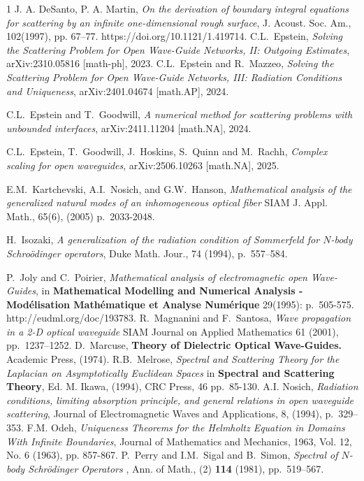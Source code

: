 \documentclass[11pt]{article}
\theoremstyle{definition}
\theoremstyle{remark}
\begin{document}
\begin{thebibliography}{1}
   {\sc J. A. DeSanto, P. A. Martin}, {\em On the
    derivation of boundary integral equations for scattering by an infinite
    one-dimensional rough surface}, J. Acoust. Soc. Am., 102(1997),
    pp. 67--77. https://doi.org/10.1121/1.419714.
    {\sc C.L.~Epstein}, {\em Solving the  Scattering
  Problem for Open Wave-Guide Networks, II: Outgoing Estimates},  	arXiv:2310.05816 [math-ph], 2023.
  {\sc C.L.~Epstein and R.~Mazzeo}, {\em Solving the Scattering Problem for
    Open Wave-Guide Networks, III: Radiation Conditions and Uniqueness},
  arXiv:2401.04674 [math.AP], 2024.

   {\sc C.L.~Epstein and T.~Goodwill}, {\em A numerical method
    for scattering problems with unbounded interfaces}, arXiv:2411.11204
    [math.NA], 2024.
 
    
      {\sc C.L.~Epstein, T.~Goodwill, J.~Hoskins, S.~Quinn and
    M.~Rachh}, {\em Complex scaling for open waveguides}, 
    arXiv:2506.10263 [math.NA], 2025.

 {\sc E.M.~Kartchevski, A.I.~Nosich, and G.W.~Hanson},   {\em Mathematical analysis
 of the generalized natural modes of an inhomogeneous optical fiber} SIAM
 J.  Appl. Math., 65(6), (2005) p.~2033-2048.

   
{\sc H.~Isozaki}, {\em A generalization of the radiation condition of Sommerfeld
  for $N$-body Schro\"odinger operators}, Duke
Math. Jour., 74 (1994), p.~557–584.

 {\sc P.~Joly and C.~Poirier}, {\em Mathematical
  analysis of electromagnetic open Wave-Guides}, in {\bf Mathematical
  Modelling and Numerical Analysis - Mod\'elisation Math\'ematique et
  Analyse Num\'erique} 29(1995): p.~505-575. http://eudml.org/doc/193783.
   {\sc R.~Magnanini and F.~Santosa}, {\em Wave propagation in a 2-D optical waveguide} SIAM Journal on Applied Mathematics 61 (2001), pp.~1237–1252.
 {\sc D.~Marcuse},  {\bf Theory of Dielectric Optical Wave-Guides.}
  Academic Press, (1974).
  {\sc R.B.~Melrose}, {\em Spectral and Scattering Theory for the Laplacian on
    Asymptotically Euclidean Spaces} in {\bf Spectral and Scattering Theory},
  Ed. M. Ikawa, (1994), CRC Press, 46 pp.~85-130.
  {\sc A.I. Nosich}, {\em Radiation conditions, limiting
      absorption principle, and general relations in open waveguide scattering},
   Journal of Electromagnetic Waves and Applications, 8, (1994), p.~329--353.
    {\sc F.M. Odeh}, {\em Uniqueness Theorems for the Helmholtz
  Equation in Domains With Infinite Boundaries}, Journal of Mathematics and
  Mechanics, 1963, Vol. 12, No. 6 (1963), pp. 857-867.
  {\sc P.~Perry and I.M.~Sigal and B.~Simon}, {\em Spectral of $N$-body Schr\"odinger Operators} , Ann. of Math.,
  (2) {\bf 114} (1981), pp.~519--567.


\end{thebibliography}
\end{document}
